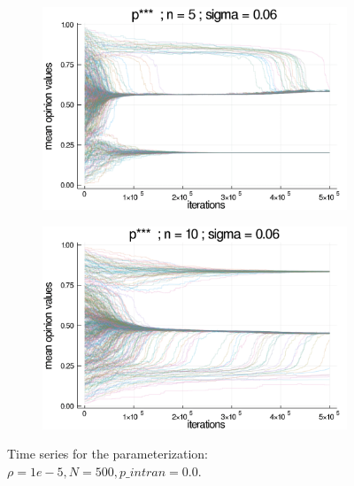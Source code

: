 \documentclass{article}
\begin{document}
{\begin{figure}[H]
      \begin{subfigure}[b]{0.49\textwidth}
        \includegraphics[width=\textwidth]{img/series/tseries6/Poodlcalculatepsssn5-rho10e-5-sigma006-00intransrandom.png}
      \end{subfigure}
            \begin{subfigure}[b]{0.49\textwidth}
        \includegraphics[width=\textwidth]{img/series/tseries6/Poodlcalculatepsssn10-rho10e-5-sigma006-00intransrandom.png}
      \end{subfigure}
      \caption{Time series for the parameterization: \(\rho = 1e-5, N = 500,
        p\_intran = 0.0 \).}
  \label{fig:tseries6}
    \end{figure}

}
\end{document}
